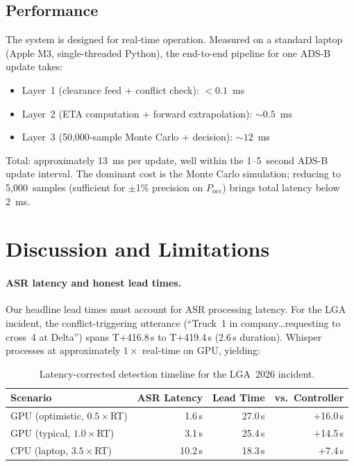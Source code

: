 \documentclass[11pt,a4paper]{article}
\begin{document}
\subsection{Performance}

The system is designed for real-time operation.
Measured on a standard laptop (Apple M3, single-threaded Python), the end-to-end pipeline for one ADS-B update takes:
\begin{itemize}[nosep]
    \item Layer~1 (clearance feed + conflict check): $< 0.1$~ms
    \item Layer~2 (ETA computation + forward extrapolation): $\sim 0.5$~ms
    \item Layer~3 (50,000-sample Monte Carlo + decision): $\sim 12$~ms
\end{itemize}
Total: approximately 13~ms per update, well within the 1--5~second ADS-B update interval.
The dominant cost is the Monte Carlo simulation; reducing to 5,000~samples (sufficient for $\pm$1\% precision on $P_{\mathrm{occ}}$) brings total latency below 2~ms.

\section{Discussion and Limitations}
\label{sec:discussion}

\paragraph{ASR latency and honest lead times.}
\label{sec:latency}
Our headline lead times must account for ASR processing latency.
For the LGA incident, the conflict-triggering utterance (``Truck~1 in company\ldots requesting to cross~4 at Delta'') spans T+416.8\,s to T+419.4\,s (2.6\,s duration).
Whisper processes at approximately $1\times$ real-time on GPU, yielding:

\begin{table}[ht]
\centering
\caption{Latency-corrected detection timeline for the LGA~2026 incident.}
\label{tab:latency}
\small
\begin{tabular}{@{}lrrr@{}}
\toprule
\textbf{Scenario} & \textbf{ASR Latency} & \textbf{Lead Time} & \textbf{vs.\ Controller} \\
\midrule
GPU (optimistic, $0.5\times$RT)  & 1.6\,s  & 27.0\,s & $+$16.0\,s \\
GPU (typical, $1.0\times$RT)     & 3.1\,s  & 25.4\,s & $+$14.5\,s \\
CPU (laptop, $3.5\times$RT)      & 10.2\,s & 18.3\,s & $+$7.4\,s \\
\bottomrule
\end{tabular}
\end{table}
\end{document}
